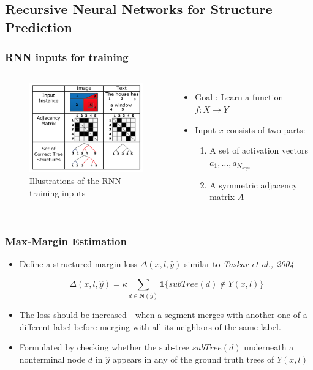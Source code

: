 \documentclass{beamer}
\begin{document}
\subsection{Recursive Neural Networks for Structure Prediction}
\frame
{
	\frametitle{RNN inputs for training}
	\begin{columns}
	\begin{figure}[ht]  
		\begin{center}
			\includegraphics[width=2.1in]{images/fig3.png}   
		\end{center}   
		\caption{Illustrations of the RNN training inputs}
	\end{figure}
	\begin{itemize}
	\item Goal : Learn a function $ f:\textit{X}\rightarrow\textit{Y} $
	\item Input $ x $ consists of two parts:
		\begin{enumerate}
		\item A set of activation vectors ${a_1, \dots, a_{N_{segs}}}$
		\item A symmetric adjacency matrix $ A $
		\end{enumerate}
	\end{itemize}
	\end{columns}
}
\frame
{
	\frametitle{Max-Margin Estimation}
	\begin{itemize}
		\item Define a structured margin loss $\Delta(x,l,\hat{y})$ similar to \textit{Taskar et al., 2004}
		\begin{Definition}
		$$ \Delta(x,l, \hat{y}) = \kappa \sum_{d \in \textbf{N}(\hat{y})} \textbf{1}\{\textit{subTree}(d) \notin Y(x,l)\}$$
		\end{Definition}
		\item The loss should be increased - when a segment merges with another one of a different label before merging with all its neighbors of the same label. 
		\item Formulated by checking whether the sub-tree $\textit{subTree}(d)$ underneath a nonterminal node $d$ 
		in $\hat{y}$ appears in any of the ground truth trees of $Y(x,l)$
	\end{itemize}
}
\end{document}
